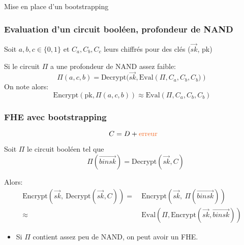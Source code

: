 \documentclass[10pt,xcolor={usenames,dvipsnames}]{beamer}
\begin{document}
\begin{section}{Mise en place d'un bootstrapping}

\begin{frame} 
\frametitle{Evaluation d'un circuit booléen, profondeur de NAND}
Soit $a,b,c\in\{0, 1\}$ et $C_a, C_b, C_c$ leurs chiffrés pour des clés ($\vec{sk}$, pk)
  \begin{center}
      \begin{tikzpicture}[scale = 1, transform shape]
      	
      \end{tikzpicture}
  \end{center}
  Si le circuit $\Pi$ a une profondeur de NAND assez faible:
  \[ \Pi(a,c,b) = \text{Decrypt}(\vec{sk}, \text{Eval}\left(\Pi, C_a, C_b, C_b)\right) \]
  On note alors:
  \[ \text{Encrypt}\left(\text{pk}, \Pi(a,c,b)\right) \approx \text{Eval}\left(\Pi, C_a, C_b, C_b\right) \]
\end{frame}

 
\begin{frame} 
\frametitle{FHE avec bootstrapping}
\[ C = D + \text{\textcolor{Orange}{erreur}} \]
  \noindent
  \begin{center}
      \begin{tikzpicture}[scale = 1, transform shape]
      	
      \end{tikzpicture}
  \end{center}
  \noindent
  \vspace{-0.7cm}

\pause

Soit $\Pi$ le circuit booléen tel que 
\[\quad\Pi(\overrightarrow{binsk})= \text{Decrypt}\left(\vec{sk}, C\right) \]

\pause
Alors:
\begin{align*}
\text{Encrypt}\left(\vec{sk},\: \text{Decrypt}\left(\vec{sk},C\right)\right) 
=&\: \text{Encrypt}\left(\vec{sk},\: \Pi(\overrightarrow{binsk})\right) \\
\approx&\: \text{Eval}\left(\Pi, \text{Encrypt}(\vec{sk}, \overrightarrow{binsk})\right)
\end{align*}
\vspace{-0.5cm}
\begin{itemize}
\item Si $\Pi$ contient assez peu de NAND, on peut avoir un FHE.
\end{itemize}


\end{frame}
\end{section}
\end{document}
